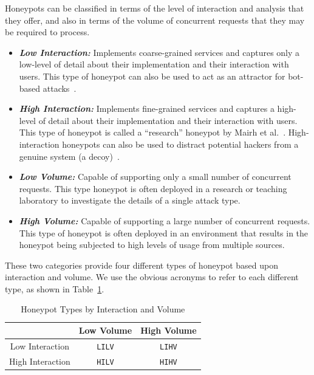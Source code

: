 Honeypots can be classified in terms of the level of interaction and
analysis that they offer, and also in terms of the volume of concurrent requests
that they may be required to process.

\begin{itemize}

  \item \noindent \emph{\textbf{Low Interaction:}} Implements coarse-grained
    services and captures only a low-level of detail about their implementation
    and their interaction with users.  This type of honeypot can also be used
    to act as an attractor for bot-based attacks~\cite{SZB:16}.  

  \item \noindent \emph{\textbf{High Interaction:}} Implements fine-grained
    services and captures a high-level of detail about their implementation and
    their interaction with users.  This type of honeypot is called a
    ``research'' honeypot by Mairh et al.~\cite{MBVJ:11}. High-interaction
    honeypots can also be used to distract potential hackers from a genuine
    system (a decoy)~\cite{M:06,SNKA:12}.

\end{itemize}


\begin{itemize}

  \item \noindent \emph{\textbf{Low Volume:}} Capable of supporting only a
    small number of concurrent requests.  This type honeypot is often deployed
    in a research or teaching laboratory to investigate the details of a single
    attack type.

  \item \noindent \emph{\textbf{High Volume:}} Capable of supporting a large
    number of concurrent requests. This type of honeypot is often deployed in
    an environment that results in the honeypot being subjected to high levels
    of usage from multiple sources. 

\end{itemize}

These two categories provide four different types of honeypot based upon
interaction and volume. We use the obvious acronyms to refer to each different
type, as shown in Table~\ref{table:HoneypotTypes}.

\begin{table}[h]
\begin{center}
\begin{tabular}{| c | c| c |}
\hline
 & Low Volume & High Volume \\
\hline
Low Interaction & \texttt{LILV} & \texttt{LIHV} \\
\hline
High Interaction & \texttt{HILV} & \texttt{HIHV} \\
\hline
\end{tabular}
\end{center}
\caption{Honeypot Types by Interaction and Volume}
\label{table:HoneypotTypes}
\end{table}

